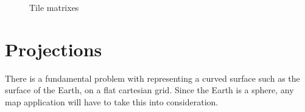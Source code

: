 \documentclass[11pt,a4paper,titlepage,oneside]{report}
\begin{document}
\begin{figure}
\caption{Tile matrixes}
\end{figure}

\section{Projections}
\label{sec:ProjectionChallenges}
There is a fundamental problem with representing a curved surface such as the surface of the Earth, on a flat cartesian grid.
Since the Earth is a sphere, any map application will have to take this into consideration.  
\end{document}
